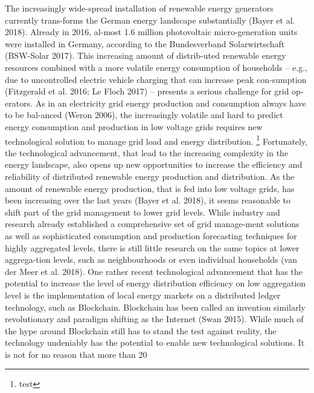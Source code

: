 The increasingly wide-spread installation of renewable energy generators currently trans-forms the German energy landscape substantially (Bayer et al. 2018). Already in 2016, al-most 1.6 million photovoltaic micro-generation units were installed in Germany, according to the Bundesverband Solarwirtschaft (BSW-Solar 2017). This increasing amount of distrib-uted renewable energy resources combined with a more volatile energy consumption of households – e.g., due to uncontrolled electric vehicle charging that can increase peak con-sumption (Fitzgerald et al. 2016; Le Floch 2017) – presents a serious challenge for grid op-erators. As in an electricity grid energy production and consumption always have to be bal-anced (Weron 2006), the increasingly volatile and hard to predict energy consumption and production in low voltage grids requires new technological solution to manage grid load and energy distribution. \footnote{test}
Fortunately, the technological advancement, that lead to the increasing complexity in the energy landscape, also opens up new opportunities to increase the efficiency and reliability of distributed renewable energy production and distribution. As the amount of renewable energy production, that is fed into low voltage grids, has been increasing over the last years (Bayer et al. 2018), it seems reasonable to shift part of the grid management to lower grid levels. While industry and research already established a comprehensive set of grid manage-ment solutions as well as sophisticated consumption and production forecasting techniques for highly aggregated levels, there is still little research on the same topics at lower aggrega-tion levels, such as neighbourhoods or even individual households (van der Meer et al. 2018).
One rather recent technological advancement that has the potential to increase the level of energy distribution efficiency on low aggregation level is the implementation of local energy markets on a distributed ledger technology, such as Blockchain. Blockchain has been called an invention similarly revolutionary and paradigm shifting as the Internet (Swan 2015). While much of the hype around Blockchain still has to stand the test against reality, the technology undeniably has the potential to enable new technological solutions. It is not for no reason that more than 20 %
